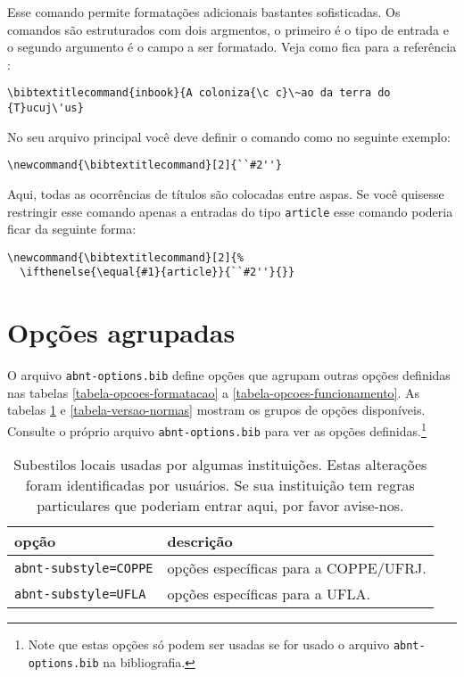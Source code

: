 \documentclass[espacosimples]{abnt}
\begin{document}
Esse comando permite formatações adicionais bastantes sofisticadas.
Os comandos são estruturados com dois argmentos, o primeiro é o tipo
de entrada e o segundo argumento é o campo a ser formatado.
Veja como fica para a referência :
\begin{verbatim}
\bibtextitlecommand{inbook}{A coloniza{\c c}\~ao da terra do {T}ucuj\'us}
\end{verbatim}

No seu arquivo principal você deve definir o comando como no seguinte exemplo:
\begin{verbatim}
\newcommand{\bibtextitlecommand}[2]{``#2''}
\end{verbatim}
Aqui, todas as ocorrências de títulos são colocadas entre aspas.
Se você quisesse restringir esse comando apenas a entradas do tipo {\tt article}
esse comando poderia ficar da seguinte forma:
\begin{verbatim}
\newcommand{\bibtextitlecommand}[2]{%
  \ifthenelse{\equal{#1}{article}}{``#2''}{}}
\end{verbatim}

\clearpage
\section{Opções agrupadas}

O arquivo {\tt abnt-options.bib} define opções que agrupam outras opções
definidas nas tabelas \ref{tabela-opcoes-formatacao} a \ref{tabela-opcoes-funcionamento}.
As tabelas \ref{tabela-subestilos} e \ref{tabela-versao-normas} mostram
os grupos de opções disponíveis. Consulte o próprio arquivo {\tt abnt-options.bib}
para ver as opções 
definidas.\footnote{Note que estas opções só podem ser usadas se for usado o arquivo  {\tt abnt-options.bib}
na bibliografia.}

\begin{table}[htbp]
\begin{center}
\begin{tabular}{lp{9cm}}\hline\hline
opção  & descrição \\ \hline
{\tt abnt-substyle=COPPE} & opções específicas para a COPPE/UFRJ.\\
{\tt abnt-substyle=UFLA} & opções específicas para a UFLA.\\
\hline\hline
\end{tabular}
\end{center}
\caption[Subestilos de diversas instituições]{
Subestilos locais usadas por algumas instituições. Estas alterações
foram identificadas por usuários. Se sua instituição
tem regras particulares que poderiam entrar aqui, por favor avise-nos.}
\label{tabela-subestilos}
\end{table}
\end{document}
